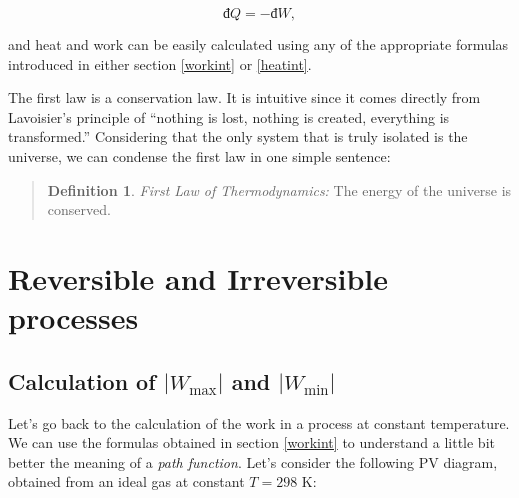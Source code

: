 \documentclass[
]{book}
\theoremstyle{definition}
\newtheorem{definition}{Definition}[chapter]
\theoremstyle{definition}
\theoremstyle{definition}
\theoremstyle{remark}
\begin{document}
\begin{equation}
  đ Q = -đ W,
  \label{eq:heateqwork}
\end{equation}

and heat and work can be easily calculated using any of the appropriate formulas introduced in either section \ref{workint} or \ref{heatint}.

The first law is a conservation law. It is intuitive since it comes directly from Lavoisier's principle of ``nothing is lost, nothing is created, everything is transformed.'' Considering that the only system that is truly isolated is the universe, we can condense the first law in one simple sentence:

\begin{quote}
\begin{definition}
\protect\hypertarget{def:firstlaw}{}{\label{def:firstlaw} }\emph{First Law of Thermodynamics:} The energy of the universe is conserved.
\end{definition}
\end{quote}

\hypertarget{reversible-and-irreversible-processes}{%
\section{Reversible and Irreversible processes}\label{reversible-and-irreversible-processes}}

\hypertarget{calculation-of-w_textmax-and-w_textmin}{%
\subsection{\texorpdfstring{Calculation of \(| W_{\text{max}} |\) and \(| W_{\text{min}} |\)}{Calculation of \textbar{} W\_\{\textbackslash text\{max\}\} \textbar{} and \textbar{} W\_\{\textbackslash text\{min\}\} \textbar{}}}\label{calculation-of-w_textmax-and-w_textmin}}

Let's go back to the calculation of the work in a process at constant temperature. We can use the formulas obtained in section \ref{workint} to understand a little bit better the meaning of a \emph{path function}. Let's consider the following PV diagram, obtained from an ideal gas at constant \(T=298\) K:
\end{document}
